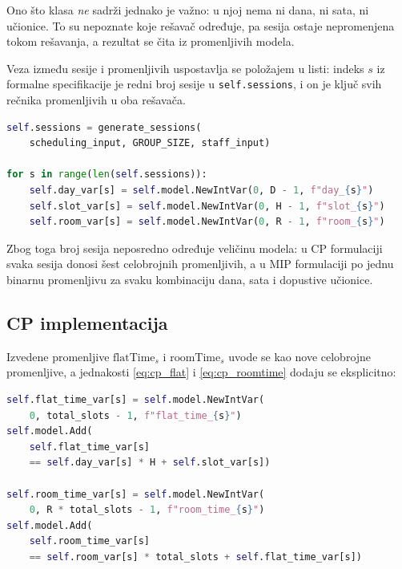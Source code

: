 \documentclass[12pt,oneside]{memoir}
\begin{document}
Ono što klasa \emph{ne} sadrži jednako je važno: u njoj nema ni dana,
ni sata, ni učionice. To su nepoznate koje rešavač određuje, pa sesija
ostaje nepromenjena tokom rešavanja, a rezultat se čita iz
promenljivih modela.

Veza između sesije i promenljivih uspostavlja se položajem u listi:
indeks $s$ iz formalne specifikacije je redni broj sesije u
\texttt{self.sessions}, i on je ključ svih rečnika promenljivih u oba
rešavača.

\begin{english}
\begin{lstlisting}[language=Python, caption={Sesije kao indeksni skup modela}]
self.sessions = generate_sessions(
    scheduling_input, GROUP_SIZE, staff_input)

for s in range(len(self.sessions)):
    self.day_var[s] = self.model.NewIntVar(0, D - 1, f"day_{s}")
    self.slot_var[s] = self.model.NewIntVar(0, H - 1, f"slot_{s}")
    self.room_var[s] = self.model.NewIntVar(0, R - 1, f"room_{s}")
\end{lstlisting}
\end{english}

Zbog toga broj sesija neposredno određuje veličinu modela: u CP
formulaciji svaka sesija donosi šest celobrojnih promenljivih, a u MIP
formulaciji po jednu binarnu promenljivu za svaku kombinaciju dana,
sata i dopustive učionice.

\subsection{CP implementacija}
\label{sec:cp_impl}

Izvedene promenljive $\text{flatTime}_s$ i $\text{roomTime}_s$ uvode se
kao nove celobrojne promenljive, a jednakosti \eqref{eq:cp_flat} i
\eqref{eq:cp_roomtime} dodaju se eksplicitno:

\begin{english}
\begin{lstlisting}[language=Python, caption={Linearizacija termina i para (učionica, termin)}]
self.flat_time_var[s] = self.model.NewIntVar(
    0, total_slots - 1, f"flat_time_{s}")
self.model.Add(
    self.flat_time_var[s]
    == self.day_var[s] * H + self.slot_var[s])

self.room_time_var[s] = self.model.NewIntVar(
    0, R * total_slots - 1, f"room_time_{s}")
self.model.Add(
    self.room_time_var[s]
    == self.room_var[s] * total_slots + self.flat_time_var[s])
\end{lstlisting}
\end{english}
\end{document}
